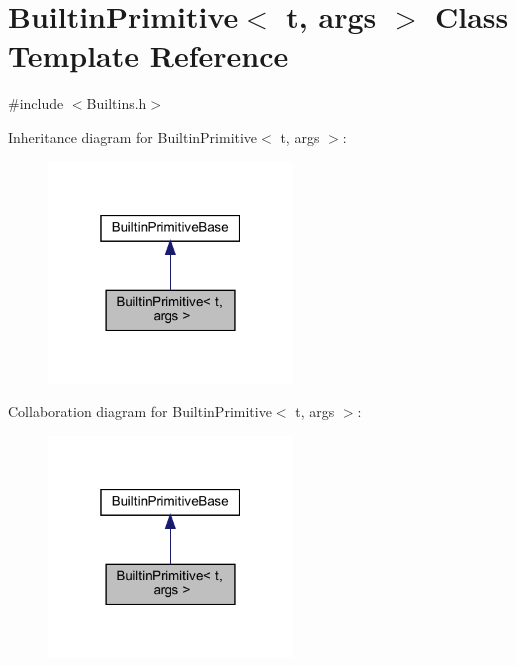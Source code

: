 \hypertarget{struct_builtin_primitive}{}\section{Builtin\+Primitive$<$ t, args $>$ Class Template Reference}
\label{struct_builtin_primitive}


{\ttfamily \#include $<$Builtins.\+h$>$}



Inheritance diagram for Builtin\+Primitive$<$ t, args $>$\+:
\nopagebreak
\begin{figure}[H]
\begin{center}
\leavevmode
\includegraphics[width=184pt]{struct_builtin_primitive__inherit__graph}
\end{center}
\end{figure}


Collaboration diagram for Builtin\+Primitive$<$ t, args $>$\+:
\nopagebreak
\begin{figure}[H]
\begin{center}
\leavevmode
\includegraphics[width=184pt]{struct_builtin_primitive__coll__graph}
\end{center}
\end{figure}
